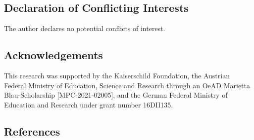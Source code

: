 \documentclass[
]{ccr}
\begin{document}
\hypertarget{declaration-of-conflicting-interests}{%
\subsection{Declaration of Conflicting
Interests}\label{declaration-of-conflicting-interests}}

The author declares no potential conflicts of interest.

\hypertarget{acknowledgements}{%
\subsection{Acknowledgements}\label{acknowledgements}}

This research was supported by the Kaiserschild Foundation, the Austrian
Federal Ministry of Education, Science and Research through an OeAD
Marietta Blau‐Scholarship {[}MPC‐2021‐02005{]}, and the German Federal
Ministry of Education and Research under grant number 16DII135.

\hypertarget{references}{%
\subsection{References}\label{references}}
\end{document}

